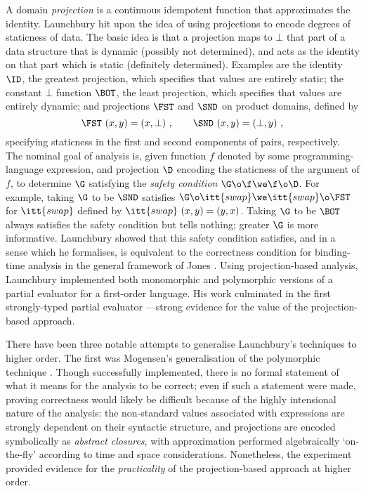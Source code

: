 A domain {\it projection\/} is a continuous idempotent function that
approximates the identity.  Launchbury \cite{Lau88} hit upon the idea
of using projections to encode degrees of staticness of data.  The
basic idea is that a projection maps to $\bot$ that part of a data
structure that is dynamic (possibly not determined), and acts as the
identity on that part which is static (definitely determined).
Examples are the identity $\ID$, the greatest projection, which
specifies that values are entirely static; the constant $\bot$ function
$\BOT$, the least projection, which specifies that values are entirely
dynamic; and projections $\FST$ and $\SND$ on product domains,
defined by
\[
\FST\ (x,y) = (x,\bot)\ ,\ \ \ \ \ \ \SND\ (x,y) = (\bot,y)\ ,
\]
specifying staticness in the first and second components of pairs, 
respectively.  The nominal goal of analysis is,
given function $f$ denoted by some programming-language expression, and
projection $\D$ encoding the staticness of the argument of $f$, to
determine $\G$ satisfying the {\it safety condition\/}
$\G\o\f\we\f\o\D$.  For example, taking $\G$ to be $\SND$ satisfies
$\G\o\itt{swap}\we\itt{swap}\o\FST$ for $\itt{swap}$ defined by
$\itt{swap}~(x,y)=(y,x)$.  Taking $\G$ to be $\BOT$ always satisfies
the safety condition but tells nothing; greater $\G$ is more
informative.  Launchbury \cite{Lau91a} showed that this safety
condition satisfies, and in a sense which he formalises, is equivalent
to the correctness condition for binding-time analysis in the general
framework of Jones \cite{Jon88}.  Using projection-based analysis,
Launchbury implemented both monomorphic and polymorphic versions of a
partial evaluator for a first-order language.  His work culminated in
the first strongly-typed partial evaluator \cite{Lau91c}---strong
evidence for the value of the projection-based approach.

There have been three notable attempts to generalise Launchbury's
techniques to higher order.  The first was Mogensen's generalisation of
the polymorphic technique \cite{Mog89}.  Though successfully
implemented, there is no formal statement of what it means for the
analysis to be correct; even if such a statement were made, proving
correctness would likely be difficult because of the highly intensional
nature of the analysis:  the non-standard values associated with
expressions are strongly dependent on their syntactic structure, and
projections are encoded symbolically as {\it abstract closures\/}, with
approximation performed algebraically `on-the-fly' according to time
and space considerations.  Nonetheless, the experiment provided
evidence for the {\it practicality\/} of the projection-based approach
at higher order.

